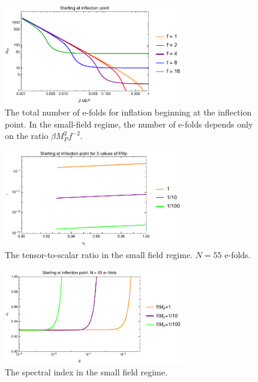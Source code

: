 \documentclass[aps,amsfonts,amsmath,prd,preprint,nofootinbib]{revtex4}
\newcommand{\MMp}{{M_P^2}}
\begin{document}
\begin{figure}[!h]
  \centering
    \includegraphics[width=0.7\textwidth]{figures/NvsBetaf-2.pdf}
    \caption{The total number of e-folds for inflation beginning at the inflection point.  In the small-field regime, the number of e-folds depends only on the ratio $\beta \MMp f^{-2}.$}
\end{figure}



\begin{figure}[!h]
  \centering
    \includegraphics[width=0.7\textwidth]{figures/rvsnsplot.pdf}
    \caption{The tensor-to-scalar ratio in the small field regime.  $N = 55$ e-folds.}
\end{figure}




\begin{figure}[!h]
  \centering
    \includegraphics[width=0.7\textwidth]{figures/nsvsbetaplot2.pdf}
    \caption{The spectral index in the small field regime.}
\end{figure}
\end{document}
